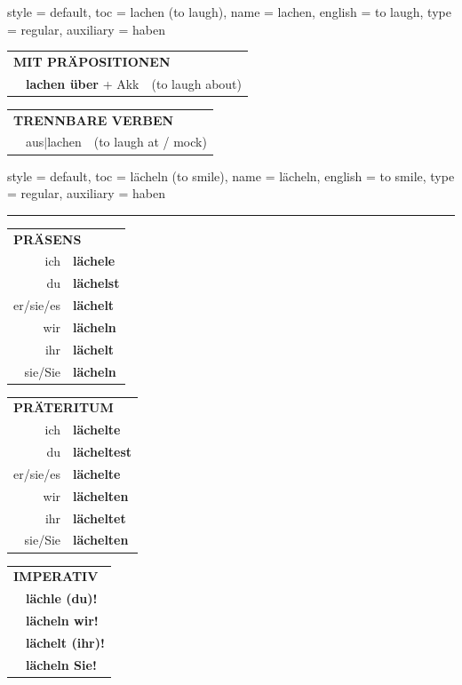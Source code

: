 \begin{verbentry}{
  style = {default},
  toc = {lachen (to laugh)},
  name = {lachen},
  english = {to laugh},
  type = {regular},
  auxiliary = {haben}
}
\vspace{10pt}

\begin{tabular}{lll}
\multicolumn{3}{l}{\textbf{MIT PRÄPOSITIONEN}}\\
& \textbf{lachen über} + Akk & (to laugh about)\\
\end{tabular}
\hfill
\begin{tabular}{lll}
\multicolumn{3}{l}{\textbf{TRENNBARE VERBEN}}\\
& aus$|$lachen & (to laugh at / mock)\\
\end{tabular}
\vspace{-5pt}
\end{verbentry}

\begin{verbentry}{
  style = {default},
  toc = {lächeln (to smile)},
  name = {lächeln},
  english = {to smile},
  type = {regular},
  auxiliary = {haben}
}


\vspace{5pt}
\hrule
\vspace{5pt}

\begin{tabular}{rl}
\multicolumn{2}{l}{\textbf{PRÄSENS}}\\
ich & \textbf{lächele}\\
du & \textbf{lächelst}\\
er/sie/es & \textbf{lächelt}\\
wir & \textbf{lächeln}\\
ihr & \textbf{lächelt}\\
sie/Sie & \textbf{lächeln}\\
\end{tabular}
\hfill
\begin{tabular}{rl}
\multicolumn{2}{l}{\textbf{PRÄTERITUM}}\\
ich & \textbf{lächelte}\\
du & \textbf{lächeltest}\\
er/sie/es & \textbf{lächelte}\\
wir & \textbf{lächelten}\\
ihr & \textbf{lächeltet}\\
sie/Sie & \textbf{lächelten}\\
\end{tabular}
\hfill
\begin{tabular}{rl}
\multicolumn{2}{l}{\textbf{IMPERATIV}}\\
& \textbf{lächle (du)!}\\
& \textbf{lächeln wir!}\\
& \textbf{lächelt (ihr)!}\\
& \textbf{lächeln Sie!}\\
\end{tabular}


\end{verbentry}
